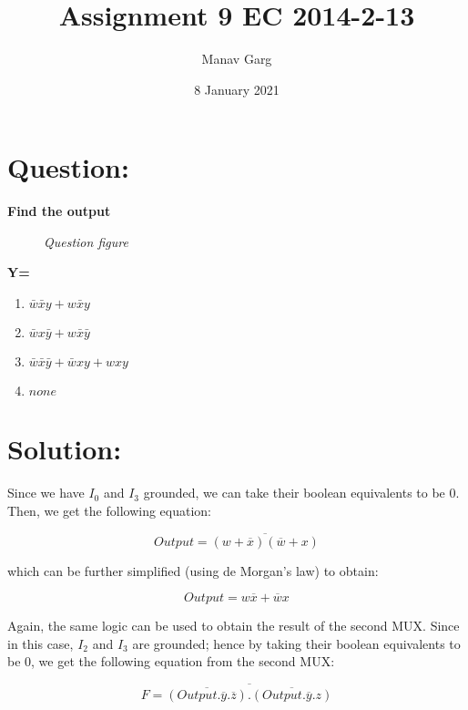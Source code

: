 \documentclass{article}
\title{Assignment 9 EC 2014-2-13}
\author{Manav Garg}
\date{8 January 2021}
\begin{document}
\maketitle

\section{Question:}

\textbf{Find the output}

\begin{figure}[!h]
\centering
\scalebox{0.8}{

}
\caption{\textit{Question figure}}
\label{mux_2}
\end{figure}

\textbf{Y=}
\begin{enumerate}[label=(\Alph*)]
\item $\bar{w}\bar{x}y + w\bar{x}y$ 
\item $\bar{w}x\bar{y} + w\bar{x}\bar{y}$
\item $\bar{w}\bar{x}\bar{y} + \bar{w}xy + wxy$
\item $none$
\end{enumerate}


\section{Solution:}


Since we have $I_0$ and $I_3$ grounded, we can take their boolean equivalents to be 0. Then, we get the following equation:

\begin{equation}
    Output = \overline{ (w + \overline{x}) (\overline{w} + x) }
\end{equation}

which can be further simplified (using de Morgan's law) to obtain:

\begin{equation}
    Output = w \overline{x} + \overline{w} x
\end{equation}

Again, the same logic can be used to obtain the result of the second MUX. Since in this case, $I_2$ and $I_3$ are grounded; hence by taking their boolean equivalents to be 0, we get the following equation from the second MUX:

\begin{equation}
    F = \overline{ \overline{(Output. \overline{y}. \overline{z})}. \overline{(Output. \overline{y}. z )}}
\end{equation}
\end{document}
